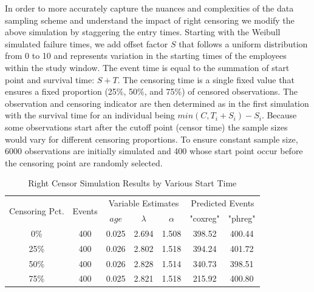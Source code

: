 \documentclass[12pt,letterpaper]{article}
\begin{document}
In order to more accurately capture the nuances and complexities of the data sampling scheme and understand the impact of right censoring we modify the above simulation by staggering the entry times.  Starting with the Weibull simulated failure times, we add offset factor $S$ that follows a uniform distribution from 0 to 10 and represents variation in the starting times of the employees within the study window. The event time is equal to the summation of start point and survival time: $S+T$. The censoring time is a single fixed value that ensures a fixed proportion (25\%, 50\%, and 75\%) of censored observations.  The observation and censoring indicator are then determined as in the first simulation with the survival time for an individual being $min(C,T_i+S_i) - S_i$. Because some observations start after the cutoff point (censor time) the sample sizes would vary for different censoring proportions.  To ensure constant sample size, 6000 observations are initially simulated and 400 whose start point occur before the censoring point are randomly selected.
 \begin{table}[htbp]
 	\renewcommand{\arraystretch}{1.5}
 	\scriptsize %
 	\centering
 	\caption{Right Censor Simulation Results by Various Start Time}
 	\begin{tabular}{ccccccc}
 		\toprule
 		\multicolumn{1}{c}{\multirow{2}{1.5cm}{Censoring Pct.}}  & \multirow{2}[4]{*}{Events} & \multicolumn{3}{c}{Variable Estimates} & \multicolumn{2}{c}{Predicted Events} \\ \cline{3-7}
 		&       & $age$   & $\lambda$ & $\alpha$ & "coxreg" & "phreg" \\
 		\midrule
 		0\%   & 400   & 0.025 & 2.694 & 1.508 & 398.52 & 400.44 \\
 		25\%  & 400   & 0.026 & 2.802 & 1.518 & 394.24 & 401.72 \\
 		50\%  & 400   & 0.026 & 2.828 & 1.514 & 340.73 & 398.51 \\
 		75\%  & 400   & 0.025 & 2.821 & 1.518 & 215.92 & 400.80 \\
 		\bottomrule
 	\end{tabular}%
 	\label{tab:right2}%
 \end{table}%
\end{document}
